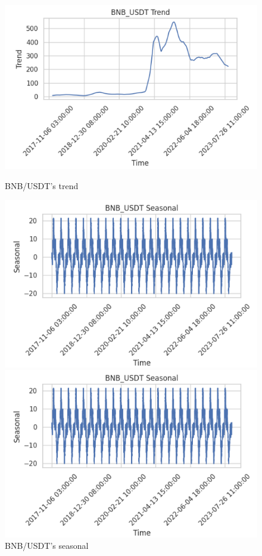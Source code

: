 \documentclass{ieeeojies}
\begin{document}
\begin{figure}[H]
    \centering
    \begin{minipage}{0.23\textwidth}
    \centering
    \includegraphics[width=1\textwidth]{bibliography/BNB_trend.png}
    \caption{BNB/USDT's trend}
    \label{fig:enter-label}
    \end{minipage}
    \hfill
    \begin{minipage}{0.23\textwidth}
    \centering
    \includegraphics[width=1\textwidth]{bibliography/BNB_seasonal.png}
    \caption{BNB/USDT's seasonal}
    \label{fig:enter-label}
    \end{minipage}
    \hfill
    \begin{minipage}{0.23\textwidth}
    \centering
    \includegraphics[width=1\textwidth]{bibliography/BNB_seasonal.png}

\end{minipage}
\end{figure}
\end{document}
